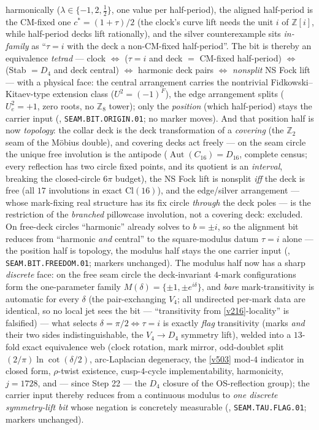\documentclass[11pt,a4paper]{article}
\newcommand{\Z}{\mathbb{Z}}
\theoremstyle{definition}
\begin{document}
harmonically ($\lambda\in\{-1,2,\tfrac12\}$, one value per half-period), the aligned half-period is
the CM-fixed one $c^*=(1{+}\tau)/2$ (the clock's curve lift needs the unit $i$ of $\Z[i]$, while
half-period decks lift rationally), and the silver counterexample sits \emph{in-family} as
``$\tau=i$ with the deck a non-CM-fixed half-period''. The bit is thereby an equivalence
\emph{tetrad} --- clock $\iff$ ($\tau{=}i$ and deck $=$ CM-fixed half-period) $\iff$ (Stab $=D_4$
and deck central) $\iff$ harmonic deck pairs $\iff$ \emph{nonsplit} NS Fock lift --- with a physical
face: the central arrangement carries the nontrivial Fidkowski--Kitaev-type extension class
($U^2=(-1)^F$), the edge arrangement splits ($U_e^2=+1$, zero roots, no $\Z_8$ tower); only the
\emph{position} (which half-period) stays the carrier input
(, \texttt{SEAM.BIT.ORIGIN.01}; no marker moves). And that position
half is now \emph{topology}: the collar deck is the deck transformation of a \emph{covering} (the
$\Z_2$ seam of the M\"obius double), and covering decks act freely --- on the seam circle the unique
free involution is the antipode ($\operatorname{Aut}(C_{16})=D_{16}$, complete census; every
reflection has two circle fixed points, and its quotient is an \emph{interval}, breaking the
closed-circle $6\pi$ budget), the NS Fock lift is nonsplit \emph{iff} the deck is free (all $17$
involutions in exact $\mathrm{Cl}(16)$), and the edge/silver arrangement --- whose mark-fixing real
structure has its fix circle \emph{through} the deck poles --- is the restriction of the
\emph{branched} pillowcase involution, not a covering deck: excluded. On free-deck circles
``harmonic'' already solves to $b=\pm i$, so the alignment bit reduces from ``harmonic \emph{and}
central'' to the square-modulus datum $\tau=i$ alone --- the position half is topology, the modulus
half stays the one carrier input
(, \texttt{SEAM.BIT.FREEDOM.01}; markers unchanged). The modulus
half now has a sharp \emph{discrete} face: on the free seam circle the deck-invariant $4$-mark
configurations form the one-parameter family $M(\delta)=\{\pm1,\pm e^{i\delta}\}$, and \emph{bare}
mark-transitivity is automatic for every $\delta$ (the pair-exchanging $V_4$; all undirected
per-mark data are identical, so no local jet sees the bit --- ``transitivity from
\vref{v216}-locality'' is falsified) --- what selects $\delta=\pi/2\iff\tau=i$ is exactly
\emph{flag} transitivity (marks \emph{and} their two sides indistinguishable, the $V_4\to D_4$
symmetry lift), welded into a $13$-fold exact equivalence web (clock rotation, mark mirror,
odd-doublet split $(2/\pi)\ln\cot(\delta/2)$, arc-Laplacian degeneracy, the \vref{v503} mod-$4$
indicator in closed form, $\rho$-twist existence, cusp-$4$-cycle implementability, harmonicity,
$j=1728$, and --- since Step 22 --- the $D_4$ closure of the OS-reflection group); the carrier
input thereby reduces from a continuous modulus to \emph{one discrete
symmetry-lift bit} whose negation is concretely measurable
(, \texttt{SEAM.TAU.FLAG.01}; markers unchanged).
\end{document}
